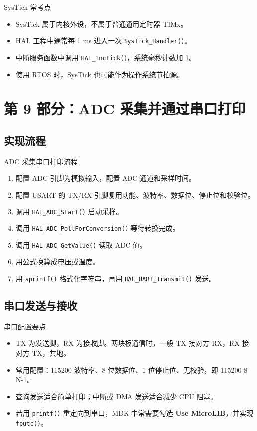 \documentclass[UTF8,fontset=none,12pt]{ctexart}
\newcommand{\api}[1]{{\footnotesize\nolinkurl{#1}}}
\begin{document}
\begin{warnbox}{SysTick 常考点}
\begin{itemize}
  \item SysTick 属于内核外设，不属于普通通用定时器 TIMx。
  \item HAL 工程中通常每 1 ms 进入一次 \api{SysTick_Handler()}。
  \item 中断服务函数中调用 \api{HAL_IncTick()}，系统毫秒计数加 1。
  \item 使用 RTOS 时，SysTick 也可能作为操作系统节拍源。
\end{itemize}
\end{warnbox}

\section{第 9 部分：ADC 采集并通过串口打印}

\subsection{实现流程}
\begin{pointbox}{ADC 采集串口打印流程}
\begin{enumerate}
  \item 配置 ADC 引脚为模拟输入，配置 ADC 通道和采样时间。
  \item 配置 USART 的 TX/RX 引脚复用功能、波特率、数据位、停止位和校验位。
  \item 调用 \api{HAL_ADC_Start()} 启动采样。
  \item 调用 \api{HAL_ADC_PollForConversion()} 等待转换完成。
  \item 调用 \api{HAL_ADC_GetValue()} 读取 ADC 值。
  \item 用公式换算成电压或温度。
  \item 用 \api{sprintf()} 格式化字符串，再用 \api{HAL_UART_Transmit()} 发送。
\end{enumerate}
\end{pointbox}

\subsection{串口发送与接收}
\begin{pointbox}{串口配置要点}
\begin{itemize}
  \item TX 为发送脚，RX 为接收脚。两块板通信时，一般 TX 接对方 RX，RX 接对方 TX，共地。
  \item 常用配置：115200 波特率、8 位数据位、1 位停止位、无校验，即 115200-8-N-1。
  \item 查询发送适合简单打印；中断或 DMA 发送适合减少 CPU 阻塞。
  \item 若用 \api{printf()} 重定向到串口，MDK 中常需要勾选 \textbf{Use MicroLIB}，并实现 \api{fputc()}。
\end{itemize}
\end{pointbox}
\end{document}
